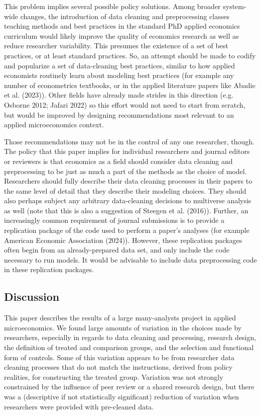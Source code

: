 \documentclass[
  letterpaper,
  DIV=11,
  numbers=noendperiod]{scrartcl}
\begin{document}
This problem implies several possible policy solutions. Among broader
system-wide changes, the introduction of data cleaning and preprocessing
classes teaching methods and best practices in the standard PhD applied
economics curriculum would likely improve the quality of economics
research as well as reduce researcher variability. This presumes the
existence of a set of best practices, or at least standard practices.
So, an attempt should be made to codify and popularize a set of
data-cleaning best practices, similar to how applied economists
routinely learn about modeling best practices (for example any number of
econometrics textbooks, or in the applied literature papers like Abadie
et al. (2023)). Other fields have already made strides in this direction
(e.g. Osborne 2012; Jafari 2022) so this effort would not need to start
from scratch, but would be improved by designing recommendations most
relevant to an applied microeconomics context.

Those recommendations may not be in the control of any one researcher,
though. The policy that this paper implies for individual researchers
and journal editors or reviewers is that economics as a field should
consider data cleaning and preprocessing to be just as much a part of
the methods as the choice of model. Researchers should fully describe
their data cleaning processes in their papers to the same level of
detail that they describe their modeling choices. They should also
perhaps subject any arbitrary data-cleaning decisions to multiverse
analysis as well (note that this is also a suggestion of Steegen et al.
(2016)). Further, an increasingly common requirement of journal
submissions is to provide a replication package of the code used to
perform a paper's analyses (for example American Economic Association
(2024)). However, these replication packages often begin from an
already-prepared data set, and only include the code necessary to run
models. It would be advisable to include data preprocessing code in
these replication packages.

\hypertarget{discussion}{%
\subsection{Discussion}\label{discussion}}

This paper describes the results of a large many-analysts project in
applied microeconomics. We found large amounts of variation in the
choices made by researchers, especially in regards to data cleaning and
processing, research design, the definition of treated and comparison
groups, and the selection and functional form of controls. Some of this
variation appears to be from researcher data cleaning processes that do
not match the instructions, derived from policy realities, for
constructing the treated group. Variation was not strongly constrained
by the influence of peer review or a shared research design, but there
was a (descriptive if not statistically significant) reduction of
variation when researchers were provided with pre-cleaned data.
\end{document}
